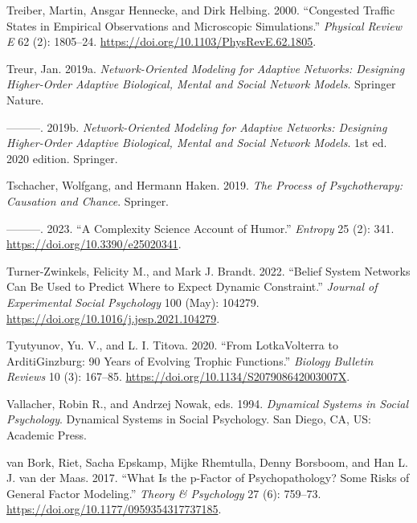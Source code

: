 \documentclass[
  a4paper,
  DIV=11,
  numbers=noendperiod,
  oneside]{scrreprt}
\newlength{\cslhangindent}
\newlength{\cslentryspacingunit} %
\newenvironment{CSLReferences}[2] %
 {%
  \setlength{\parindent}{0pt}
  \ifodd #1
  \let\oldpar\par
  \def\par{\hangindent=\cslhangindent\oldpar}
  \fi
  \setlength{\parskip}{#2\cslentryspacingunit}
 }%
 {}
\begin{document}
\begin{CSLReferences}{1}{0}
\leavevmode{}%
Treiber, Martin, Ansgar Hennecke, and Dirk Helbing. 2000. {``Congested
Traffic States in Empirical Observations and Microscopic Simulations.''}
\emph{Physical Review E} 62 (2): 1805--24.
\url{https://doi.org/10.1103/PhysRevE.62.1805}.

\leavevmode{}%
Treur, Jan. 2019a. \emph{Network-{Oriented Modeling} for {Adaptive
Networks}: {Designing Higher-Order Adaptive Biological}, {Mental} and
{Social Network Models}}. {Springer Nature}.

\leavevmode{}%
---------. 2019b. \emph{Network-Oriented Modeling for Adaptive Networks:
Designing Higher-Order Adaptive Biological, Mental and Social Network
Models}. 1st ed. 2020 edition. Springer.

\leavevmode{}%
Tschacher, Wolfgang, and Hermann Haken. 2019. \emph{The Process of
Psychotherapy: Causation and Chance}. Springer.

\leavevmode{}%
---------. 2023. {``A Complexity Science Account of Humor.''}
\emph{Entropy} 25 (2): 341. \url{https://doi.org/10.3390/e25020341}.

\leavevmode{}%
Turner-Zwinkels, Felicity M., and Mark J. Brandt. 2022. {``Belief System
Networks Can Be Used to Predict Where to Expect Dynamic Constraint.''}
\emph{Journal of Experimental Social Psychology} 100 (May): 104279.
\url{https://doi.org/10.1016/j.jesp.2021.104279}.

\leavevmode{}%
Tyutyunov, Yu. V., and L. I. Titova. 2020. {``From
Lotka{\textendash}Volterra to Arditi{\textendash}Ginzburg: 90 Years of
Evolving Trophic Functions.''} \emph{Biology Bulletin Reviews} 10 (3):
167--85. \url{https://doi.org/10.1134/S207908642003007X}.

\leavevmode{}%
Vallacher, Robin R., and Andrzej Nowak, eds. 1994. \emph{Dynamical
Systems in Social Psychology}. Dynamical Systems in Social Psychology.
{San Diego, CA, US}: {Academic Press}.

\leavevmode{}%
van Bork, Riet, Sacha Epskamp, Mijke Rhemtulla, Denny Borsboom, and Han
L. J. van der Maas. 2017. {``What Is the p-Factor of Psychopathology?
{Some} Risks of General Factor Modeling.''} \emph{Theory \& Psychology}
27 (6): 759--73. \url{https://doi.org/10.1177/0959354317737185}.


\end{CSLReferences}
\end{document}
